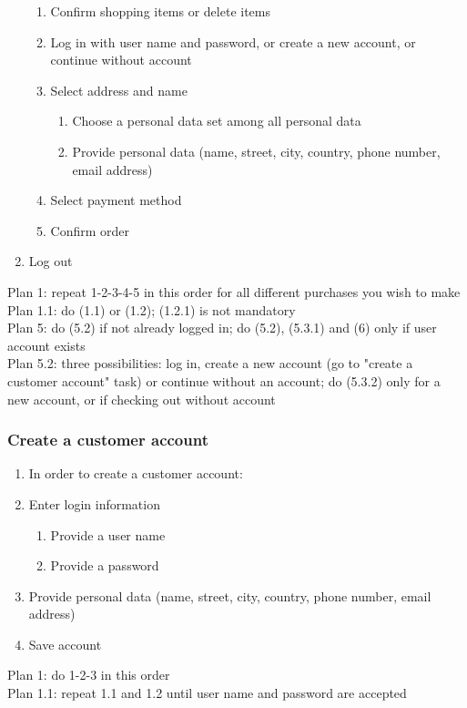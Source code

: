 \begin{enumerate}[label*=\arabic*.,start=0,itemsep=-5pt]
\begin{enumerate}[label*=\arabic*.,itemsep=-5pt]
      \item Confirm shopping items or delete items
      \item Log in with user name and password, or create a new account, or continue without account
      \item Select address and name
	\begin{enumerate}[label*=\arabic*.,itemsep=-5pt]
	  \item Choose a personal data set among all personal data 
	  \item Provide personal data (name, street, city, country, phone number, email address)
        \end{enumerate}
      \item Select payment method
      \item Confirm order      
    \end{enumerate}
  \item Log out
\end{enumerate}
Plan 1: repeat 1-2-3-4-5 in this order for all different purchases you wish to make\\
Plan 1.1: do (1.1) or (1.2); (1.2.1) is not mandatory\\
Plan 5: do (5.2) if not already logged in; do (5.2), (5.3.1) and (6) only if user account exists\\
Plan 5.2: three possibilities: log in, create a new account (go to "create a customer account" task) or continue without an account; do (5.3.2) only for a new account, or if checking out without account

\subsubsection{Create a customer account}
\begin{enumerate}[label*=\arabic*.,start=0,itemsep=-5pt]
  \item In order to create a customer account:
  \item Enter login information
  \begin{enumerate}[label*=\arabic*.,itemsep=-5pt]
		\item Provide a user name
		\item Provide a password
	\end{enumerate}
  \item Provide personal data (name, street, city, country, phone number, email address)
  \item Save account
\end{enumerate}
Plan 1: do 1-2-3 in this order\\
Plan 1.1: repeat 1.1 and 1.2 until user name and password are accepted

